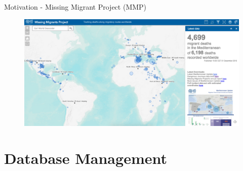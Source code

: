 \documentclass{beamer}
\begin{document}
\begin{frame}{Motivation - Missing Migrant Project (MMP)}





\begin{figure}[H]
\centering
\includegraphics[scale=0.225]{MMP.png}
\label{heat}
\end{figure}

\href{https://missingmigrants.iom.int/}{}

\end{frame}

\section{Database Management}
\end{document}
